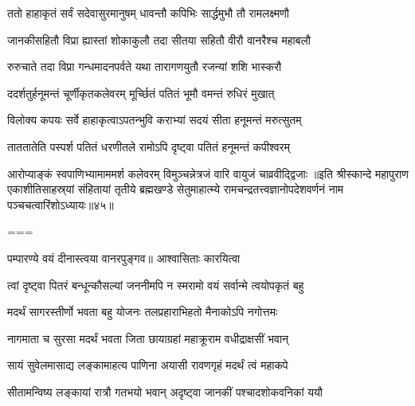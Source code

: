 \twolineshloka
{ततो हाहाकृतं सर्वं सदेवासुरमानुषम्}
{धावन्तौ कपिभिः सार्द्धमुभौ तौ रामलक्ष्मणौ}%

\twolineshloka
{जानकीसहितौ विप्रा ह्यास्तां शोकाकुलौ तदा}
{सीतया सहितौ वीरौ वानरैश्च महाबलौ}%

\twolineshloka
{रुरुचाते तदा विप्रा गन्धमादनपर्वते}
{यथा तारागणयुतौ रजन्यां शशि भास्करौ}%

\twolineshloka
{ददर्शतुर्हनूमन्तं चूर्णीकृतकलेवरम्}
{मूर्च्छितं पतितं भूमौ वमन्तं रुधिरं मुखात्}%

\twolineshloka
{विलोक्य कपयः सर्वे हाहाकृत्वाऽपतन्भुवि}
{कराभ्यां सदयं सीता हनूमन्तं मरुत्सुतम्}%

\twolineshloka
{ताततातेति पस्पर्श पतितं धरणीतले}
{रामोऽपि दृष्ट्वा पतितं हनूमन्तं कपीश्वरम्}%

\twolineshloka
{आरोप्याङ्कं स्वपाणिभ्यामाममर्श कलेवरम्}
{विमुञ्चन्नेत्रजं वारि वायुजं चाव्रवीद्द्विजाः}%
॥इति श्रीस्कान्दे महापुराण एकाशीतिसाहस्र्यां संहितायां तृतीये ब्रह्मखण्डे सेतुमाहात्म्ये रामचन्द्रतत्त्वज्ञानोपदेशवर्णनं नाम पञ्चचत्वारिंशोऽध्यायः॥४५॥

===


\vakta{}
\shrota{}
\tags{}
\notes{}

\storymeta






\twolineshloka
{पम्पारण्ये वयं दीनास्त्वया वानरपुङ्गव॥}
{आश्वासिताः कारयित्वा}%

\twolineshloka
{त्वां दृष्ट्वा पितरं बन्धून्कौसल्यां जननीमपि}
{न स्मरामो वयं सर्वान्मे त्वयोपकृतं बहु}%

\twolineshloka
{मदर्थं सागरस्तीर्णो भवता बहु योजनः}
{तलप्रहाराभिहतो मैनाकोऽपि नगोत्तमः}%

\twolineshloka
{नागमाता च सुरसा मदर्थं भवता जिता}
{छायाग्रहां महाक्रूराम वधीद्राक्षसीं भवान्}%

\twolineshloka
{सायं सुवेलमासाद्य लङ्कामाहत्य पाणिना}
{अयासी रावणगृहं मदर्थं त्वं महाकपे}%

\twolineshloka
{सीतामन्विष्य लङ्कायां रात्रौ गतभयो भवान्}
{अदृष्ट्वा जानकीं पश्चादशोकवनिकां ययौ}%

